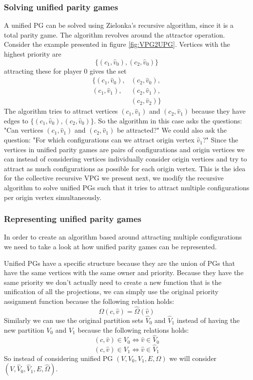 \subsubsection{Solving unified parity games}
A unified PG can be solved using Zielonka's recursive algorithm, since it is a total parity game. The algorithm revolves around the attractor operation. Consider the example presented in figure \ref{fig:VPG2UPG}. Vertices with the highest priority are 
\[ \{(c_1,\hat{v}_0),(c_2,\hat{v}_0)\}\]
attracting these for player $0$ gives the set 
\begin{align*}
\{(c_1,\hat{v}_0),&(c_2,\hat{v}_0),\\
(c_1,\hat{v}_1),&(c_2,\hat{v}_1),\\
 &(c_2,\hat{v}_2)\}
\end{align*}
The algorithm tries to attract vertices $(c_1,\hat{v}_1)$ and $(c_2,\hat{v}_1)$ because they have edges to $\{(c_1,\hat{v}_0), (c_2,\hat{v}_0)\}$. So the algorithm in this case asks the questions: "Can vertices $(c_1,\hat{v}_1)$ and $(c_2,\hat{v}_1)$ be attracted?" We could also ask the question: "For which configurations can we attract origin vertex $\hat{v}_1$?" Since the vertices in unified parity games are pairs of configurations and origin vertices we can instead of considering vertices individually consider origin vertices and try to attract as much configurations as possible for each origin vertex. This is the idea for the collective recursive VPG we present next, we modify the recursive algorithm to solve unified PGs such that it tries to attract multiple configurations per origin vertex simultaneously.

\subsubsection{Representing unified parity games}
In order to create an algorithm based around attracting multiple configurations we need to take a look at how unified parity games can be represented.


Unified PGs have a specific structure because they are the union of PGs that have the same vertices with the same owner and priority. Because they have the same priority we don't actually need to create a new function that is the unification of all the projections, we can simply use the original priority assignment function because the following relation holds:
\[ \Omega(c,\hat{v}) = \hat{\Omega}(\hat{v}) \]
Similarly we can use the original partition sets $\hat{V}_0$ and $\hat{V}_1$ instead of having the new partition $V_0$ and $V_1$ because the following relations holds:
\[ (c,\hat{v}) \in V_0 \iff \hat{v}\in \hat{V}_0 \]
\[ (c,\hat{v}) \in V_1 \iff \hat{v}\in \hat{V}_1 \]
So instead of considering unified PG $(V,V_0,V_1,E,\Omega)$ we will consider $(V,\hat{V}_0,\hat{V}_1,E,\hat{\Omega})$. 

